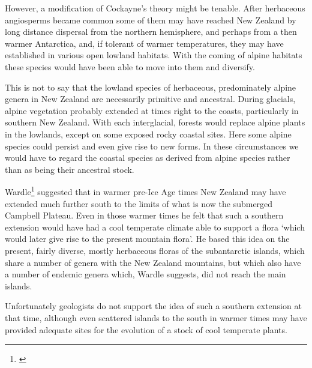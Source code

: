 However, a modification of Cockayne's theory might be tenable.
After herbaceous angiosperms became common some of them may have reached New Zealand by long distance dispersal from the northern hemisphere, and perhaps from a then warmer Antarctica, and, if tolerant of warmer temperatures, they may have established in various open lowland habitats.
With the coming of alpine habitats these species would have been able to move into them and diversify.

This is not to say that the lowland species of herbaceous, predominately alpine genera in New Zealand are necessarily primitive and ancestral.
During glacials, alpine vegetation probably extended at times right to the coasts, particularly in southern New Zealand.
With each interglacial, forests would replace alpine plants in the lowlands, except on some exposed rocky coastal sites.
Here some alpine species could persist and even give rise to new forms.
In these circumstances we would have to regard the coastal species as derived from alpine species rather than as being their ancestral stock.

Wardle\footnote{\cite{wardle1963evolution}} suggested that in warmer pre-Ice Age times New Zealand may have extended much further south to the limits of what is now the submerged Campbell Plateau.
Even in those warmer times he felt that such a southern extension would have had a cool temperate climate able to support a flora `which would later give rise to the present mountain flora'.
He based this idea on the present, fairly diverse, mostly herbaceous floras of the subantarctic islands, which share a number of genera with the New Zealand mountains, but which also have a number of endemic genera which, Wardle suggests, did not reach the main islands.

Unfortunately geologists do not support the idea of such a southern extension at that time, although even scattered islands to the south in warmer times may have provided adequate sites for the evolution of a stock of cool temperate plants.


